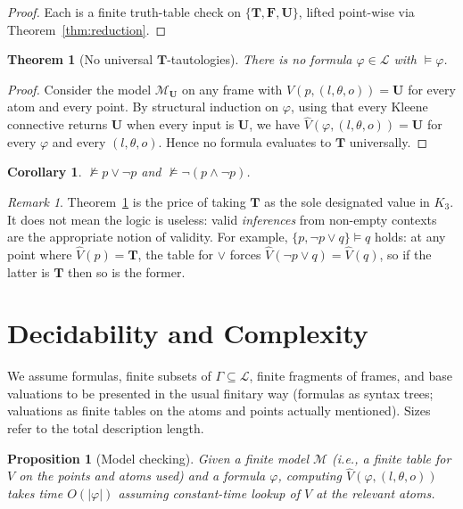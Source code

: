 \documentclass[11pt,a4paper]{article}
\theoremstyle{definition}
\theoremstyle{plain}
\newtheorem{proposition}[definition]{Proposition}
\newtheorem{theorem}[definition]{Theorem}
\newtheorem{corollary}[definition]{Corollary}
\theoremstyle{remark}
\newtheorem{remark}[definition]{Remark}
\newcommand{\Tv}{\mathbf{T}}
\newcommand{\Fv}{\mathbf{F}}
\newcommand{\Uv}{\mathbf{U}}
\newcommand{\Vals}{\{\Tv, \Fv, \Uv\}}
\newcommand{\Vh}{\widehat{V}}
\newcommand{\frm}{(l, \theta, o)}
\newcommand{\entails}{\vDash}
\newcommand{\Lang}{\mathcal{L}}
\newcommand{\Mod}{\mathcal{M}}
\begin{document}
\begin{proof}
Each is a finite truth-table check on $\Vals$, lifted point-wise via
Theorem~\ref{thm:reduction}.
\end{proof}

\begin{theorem}[No universal $\Tv$-tautologies]\label{thm:notaut}
There is no formula $\varphi \in \Lang$ with $\entails \varphi$.
\end{theorem}

\begin{proof}
Consider the model $\Mod_\Uv$ on any frame with $V(p, \frm) = \Uv$ for
every atom and every point. By structural induction on $\varphi$, using
that every Kleene connective returns $\Uv$ when every input is $\Uv$, we
have $\Vh(\varphi, \frm) = \Uv$ for every $\varphi$ and every $\frm$.
Hence no formula evaluates to $\Tv$ universally.
\end{proof}

\begin{corollary}\label{cor:lem}
$\not\entails p \lor \lnot p$ and $\not\entails \lnot(p \land \lnot p)$.
\end{corollary}

\begin{remark}
Theorem~\ref{thm:notaut} is the price of taking $\Tv$ as the sole
designated value in $K_3$. It does not mean the logic is useless: valid
\emph{inferences} from non-empty contexts are the appropriate notion of
validity. For example, $\{p, \lnot p \lor q\} \entails q$ holds: at any
point where $\Vh(p) = \Tv$, the table for $\lor$ forces
$\Vh(\lnot p \lor q) = \Vh(q)$, so if the latter is $\Tv$ then so is the
former.
\end{remark}

\section{Decidability and Complexity}
\label{sec:complexity}

We assume formulas, finite subsets of $\Gamma \subseteq \Lang$, finite
fragments of frames, and base valuations to be presented in the usual
finitary way (formulas as syntax trees; valuations as finite tables on
the atoms and points actually mentioned). Sizes refer to the total
description length.

\begin{proposition}[Model checking]
\label{prop:mc}
Given a finite model $\Mod$ (i.e., a finite table for $V$ on the points
and atoms used) and a formula $\varphi$, computing
$\Vh(\varphi, \frm)$ takes time $O(|\varphi|)$ assuming constant-time
lookup of $V$ at the relevant atoms.
\end{proposition}
\end{document}
